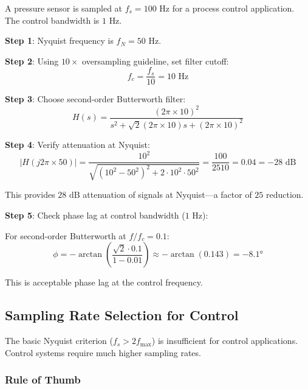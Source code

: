 \begin{example}
\label{ex:aa_filter}

A pressure sensor is sampled at $f_s = 100\text{ Hz}$ for a process control application. The control bandwidth is $1\text{ Hz}$.

\textbf{Step 1}: Nyquist frequency is $f_N = 50\text{ Hz}$.

\textbf{Step 2}: Using $10\times$ oversampling guideline, set filter cutoff:
\begin{equation}
f_c = \frac{f_s}{10} = 10\text{ Hz}
\end{equation}

\textbf{Step 3}: Choose second-order Butterworth filter:
\begin{equation}
H(s) = \frac{(2\pi \times 10)^2}{s^2 + \sqrt{2}(2\pi \times 10)s + (2\pi \times 10)^2}
\end{equation}

\textbf{Step 4}: Verify attenuation at Nyquist:
\begin{equation}
|H(j2\pi \times 50)| = \frac{10^2}{\sqrt{(10^2 - 50^2)^2 + 2 \cdot 10^2 \cdot 50^2}} = \frac{100}{2510} = 0.04 = -28\text{ dB}
\end{equation}

This provides $28\text{ dB}$ attenuation of signals at Nyquist---a factor of $25$ reduction.

\textbf{Step 5}: Check phase lag at control bandwidth ($1\text{ Hz}$):

For second-order Butterworth at $f/f_c = 0.1$:
\begin{equation}
\phi = -\arctan\left(\frac{\sqrt{2} \cdot 0.1}{1 - 0.01}\right) \approx -\arctan(0.143) = -8.1°
\end{equation}

This is acceptable phase lag at the control frequency.
\end{example}

\subsection{Sampling Rate Selection for Control}

The basic Nyquist criterion ($f_s > 2f_{\max}$) is insufficient for control applications. Control systems require much higher sampling rates.

\subsubsection{Rule of Thumb}

